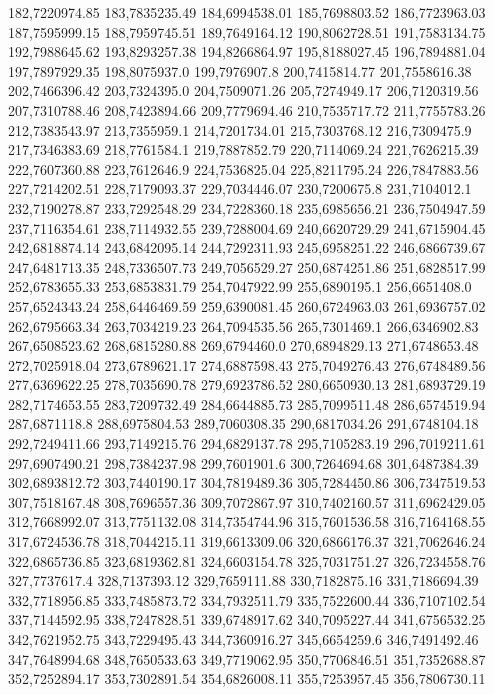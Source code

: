 182,7220974.85
183,7835235.49
184,6994538.01
185,7698803.52
186,7723963.03
187,7595999.15
188,7959745.51
189,7649164.12
190,8062728.51
191,7583134.75
192,7988645.62
193,8293257.38
194,8266864.97
195,8188027.45
196,7894881.04
197,7897929.35
198,8075937.0
199,7976907.8
200,7415814.77
201,7558616.38
202,7466396.42
203,7324395.0
204,7509071.26
205,7274949.17
206,7120319.56
207,7310788.46
208,7423894.66
209,7779694.46
210,7535717.72
211,7755783.26
212,7383543.97
213,7355959.1
214,7201734.01
215,7303768.12
216,7309475.9
217,7346383.69
218,7761584.1
219,7887852.79
220,7114069.24
221,7626215.39
222,7607360.88
223,7612646.9
224,7536825.04
225,8211795.24
226,7847883.56
227,7214202.51
228,7179093.37
229,7034446.07
230,7200675.8
231,7104012.1
232,7190278.87
233,7292548.29
234,7228360.18
235,6985656.21
236,7504947.59
237,7116354.61
238,7114932.55
239,7288004.69
240,6620729.29
241,6715904.45
242,6818874.14
243,6842095.14
244,7292311.93
245,6958251.22
246,6866739.67
247,6481713.35
248,7336507.73
249,7056529.27
250,6874251.86
251,6828517.99
252,6783655.33
253,6853831.79
254,7047922.99
255,6890195.1
256,6651408.0
257,6524343.24
258,6446469.59
259,6390081.45
260,6724963.03
261,6936757.02
262,6795663.34
263,7034219.23
264,7094535.56
265,7301469.1
266,6346902.83
267,6508523.62
268,6815280.88
269,6794460.0
270,6894829.13
271,6748653.48
272,7025918.04
273,6789621.17
274,6887598.43
275,7049276.43
276,6748489.56
277,6369622.25
278,7035690.78
279,6923786.52
280,6650930.13
281,6893729.19
282,7174653.55
283,7209732.49
284,6644885.73
285,7099511.48
286,6574519.94
287,6871118.8
288,6975804.53
289,7060308.35
290,6817034.26
291,6748104.18
292,7249411.66
293,7149215.76
294,6829137.78
295,7105283.19
296,7019211.61
297,6907490.21
298,7384237.98
299,7601901.6
300,7264694.68
301,6487384.39
302,6893812.72
303,7440190.17
304,7819489.36
305,7284450.86
306,7347519.53
307,7518167.48
308,7696557.36
309,7072867.97
310,7402160.57
311,6962429.05
312,7668992.07
313,7751132.08
314,7354744.96
315,7601536.58
316,7164168.55
317,6724536.78
318,7044215.11
319,6613309.06
320,6866176.37
321,7062646.24
322,6865736.85
323,6819362.81
324,6603154.78
325,7031751.27
326,7234558.76
327,7737617.4
328,7137393.12
329,7659111.88
330,7182875.16
331,7186694.39
332,7718956.85
333,7485873.72
334,7932511.79
335,7522600.44
336,7107102.54
337,7144592.95
338,7247828.51
339,6748917.62
340,7095227.44
341,6756532.25
342,7621952.75
343,7229495.43
344,7360916.27
345,6654259.6
346,7491492.46
347,7648994.68
348,7650533.63
349,7719062.95
350,7706846.51
351,7352688.87
352,7252894.17
353,7302891.54
354,6826008.11
355,7253957.45
356,7806730.11
